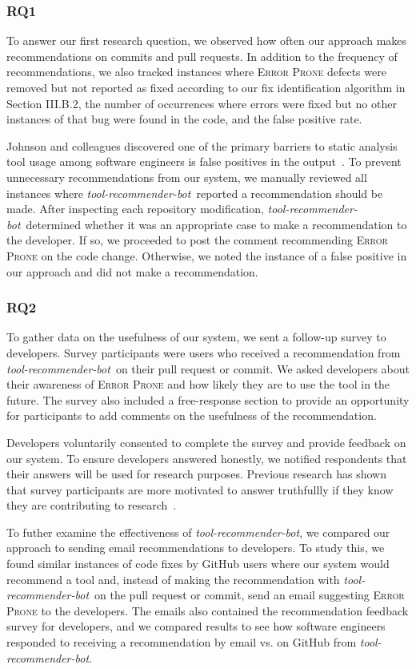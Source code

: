 \documentclass[sigconf,review,anonymous]{acmart}
\newcommand{\tool}{\textsl{tool-recommender-bot}}
\begin{document}
\subsubsection{RQ1}

To answer our first research question, we observed how often our approach makes recommendations on commits and pull requests. In addition to the frequency of recommendations, we also tracked instances where \textsc{Error Prone} defects were removed but not reported as fixed according to our fix identification algorithm in Section III.B.2, the number of occurrences where errors were fixed but no other instances of that bug were found in the code, and the false positive rate.

Johnson and colleagues discovered one of the primary barriers to static analysis tool usage among software engineers is false positives in the output~\cite{Johnson2013Why}. To prevent unnecessary recommendations from our system, we manually reviewed all instances where \tool~reported a recommendation should be made. After inspecting each repository modification, \tool~determined whether it was an appropriate case to make a recommendation to the developer. If so, we proceeded to post the comment recommending \textsc{Error Prone} on the code change. Otherwise, we noted the instance of a false positive in our approach and did not make a recommendation.

\subsubsection{RQ2}

To gather data on the usefulness of our system, we sent a follow-up survey to developers. Survey participants were users who received a recommendation from \tool~on their pull request or commit. We asked developers about their awareness of \textsc{Error Prone} and how likely they are to use the tool in the future. The survey also included a free-response section to provide an opportunity for participants to add comments on the usefulness of the recommendation.

Developers voluntarily consented to complete the survey and provide feedback on our system. To ensure developers answered honestly, we notified respondents that their answers will be used for research purposes. Previous research has shown that survey participants are more motivated to answer truthfullly if they know they are contributing to research~\cite{Krosnick1991Research}. 

To futher examine the effectiveness of \tool, we compared our approach to sending email recommendations to developers. To study this, we found similar instances of code fixes by GitHub users where our system would recommend a tool and, instead of making the recommendation with \tool~on the pull request or commit, send an email suggesting \textsc{Error Prone} to the developers. The emails also contained the recommendation feedback survey for developers, and we compared results to see how software engineers responded to receiving a recommendation by email vs. on GitHub from \tool.
\end{document}
